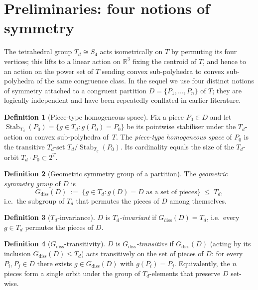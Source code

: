 \documentclass[11pt,a4paper]{article}
\theoremstyle{plain}
\theoremstyle{definition}
\newtheorem{definition}[definition]{Definition}
\theoremstyle{remark}
\DeclareMathOperator{\Stab}{Stab}
\newcommand{\Td}{T_{\!d}}
\newcommand{\R}{\mathbb{R}}
\begin{document}
\section{Preliminaries: four notions of symmetry}\label{sec:prelim}

The tetrahedral group $\Td \cong S_{4}$ acts isometrically on $T$ by permuting
its four vertices; this lifts to a linear action on $\R^{3}$ fixing the
centroid of $T$, and hence to an action on the power set of $T$ sending convex
sub-polyhedra to convex sub-polyhedra of the same congruence class.  In the
sequel we use four distinct notions of symmetry attached to a congruent
partition $D = \{P_{1},\ldots,P_{n}\}$ of $T$; they are logically independent
and have been repeatedly conflated in earlier literature.

\begin{definition}[Piece-type homogeneous space]\label{def:piece-type}
Fix a piece $P_{0} \in D$ and let
$\Stab_{\Td}(P_{0}) = \{ g \in \Td : g(P_{0}) = P_{0} \}$ be its pointwise
stabiliser under the $\Td$-action on convex sub-polyhedra of~$T$.  The
\emph{piece-type homogeneous space} of $P_{0}$ is the transitive $\Td$-set
$\Td / \Stab_{\Td}(P_{0})$.  Its cardinality equals the size of the
$\Td$-orbit $\Td \cdot P_{0} \subset 2^{T}$.
\end{definition}

\begin{definition}[Geometric symmetry group of a partition]\label{def:gdiss}
The \emph{geometric symmetry group} of $D$ is
\[
  G_{\mathrm{diss}}(D) \;:=\; \{ g \in \Td : g(D) = D \text{ as a set of pieces}\}
  \;\leq\; \Td,
\]
i.e.\ the subgroup of $\Td$ that permutes the pieces of $D$ among themselves.
\end{definition}

\begin{definition}[$\Td$-invariance]\label{def:td-invariance}
$D$ is \emph{$\Td$-invariant} if $G_{\mathrm{diss}}(D) = \Td$, i.e.\ every
$g \in \Td$ permutes the pieces of $D$.
\end{definition}

\begin{definition}[$G_{\mathrm{diss}}$-transitivity]\label{def:gdiss-transitive}
$D$ is \emph{$G_{\mathrm{diss}}$-transitive} if $G_{\mathrm{diss}}(D)$ (acting
by its inclusion $G_{\mathrm{diss}}(D) \leq \Td$) acts transitively on the set
of pieces of $D$: for every $P_{i}, P_{j} \in D$ there exists
$g \in G_{\mathrm{diss}}(D)$ with $g(P_{i}) = P_{j}$.  Equivalently, the $n$
pieces form a single orbit under the group of $\Td$-elements that preserve
$D$ set-wise.
\end{definition}
\end{document}
